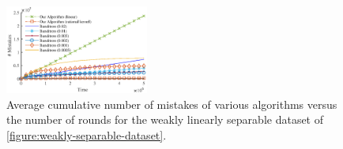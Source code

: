 \begin{figure}
\centering
\includegraphics[width=0.42\textwidth]{figures/weak3}
\caption{Average cumulative number of mistakes of various algorithms versus the
number of rounds for the weakly linearly separable dataset of
\autoref{figure:weakly-separable-dataset}.}
\label{figure:number-of-mistakes-weakly-separable-dataset}
\end{figure}
